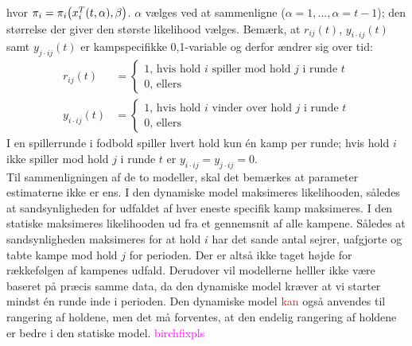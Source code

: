 \documentclass[11pt,a4paper]{article}
\begin{document}
hvor $\pi_i=\pi_i\big{(}x_i^T(t,\alpha),\beta\big{)}$. $\alpha$ vælges ved at sammenligne ($\alpha=1,...,\alpha=t-1$); den størrelse der giver den største likelihood vælges. Bemærk, at $r_{ij}(t)$, $y_{i\cdot ij}(t)$ samt $y_{j\cdot ij}(t)$ er kampspecifikke {0,1}-variable og derfor ændrer sig over tid:
\begin{align*}
r_{ij}(t)&=\begin{cases}
1\text{, hvis hold $i$ spiller mod hold $j$ i runde $t$}\\
0\text{, ellers}
\end{cases}\\
y_{i\cdot ij}(t)&=\begin{cases}
1\text{, hvis hold $i$ vinder over hold $j$ i runde $t$}\\
0\text{, ellers}
\end{cases}
\end{align*}
I en spillerrunde i fodbold spiller hvert hold kun én kamp per runde; hvis hold $i$ ikke spiller mod hold $j$ i runde $t$ er $y_{i\cdot ij}=y_{j\cdot ij}=0$.\\
Til sammenligningen af de to modeller, skal det bemærkes at parameter estimaterne ikke er ens. I den dynamiske model maksimeres likelihooden, således at sandsynligheden for udfaldet af hver eneste specifik kamp maksimeres. I den statiske maksimeres likelihooden ud fra et gennemsnit af alle kampene. Således at sandsynligheden maksimeres for at hold $i$ har det sande antal sejrer, uafgjorte og tabte kampe mod hold $j$ for perioden. Der er altså ikke taget højde for rækkefølgen af kampenes udfald. Derudover vil modellerne helller ikke være baseret på præcis samme data, da den dynamiske model kræver at vi starter mindst én runde inde i perioden. Den dynamiske model \textcolor{red}{kan} også anvendes til rangering af holdene, men det må forventes, at den endelig rangering af holdene er bedre i den statiske model. \textcolor{magenta}{birchfixpls}
\end{document}
